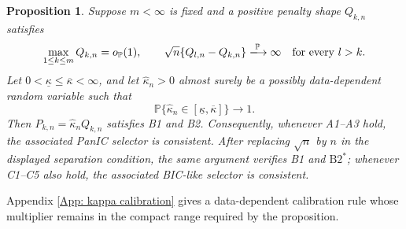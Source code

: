 \documentclass[12pt]{article}
\newenvironment{bluechange}{\begingroup\color[rgb]{0.00,0.00,1.00}}{\endgroup}
\newtheorem{proposition}{Proposition}
\theoremstyle{remark}
\theoremstyle{plain}
\begin{document}
\begin{bluechange}
\begin{proposition}\label{Prop: uniform kappa}
Suppose $m<\infty$ is fixed and a positive penalty shape $Q_{k,n}$ satisfies
\[
\max_{1\le k\le m}Q_{k,n}=o_{\mathbb P}(1),
\qquad
\sqrt n\{Q_{l,n}-Q_{k,n}\}\xlongrightarrow{\mathbb P}\infty
\quad\text{for every }l>k.
\]
Let $0<\underline\kappa\le\overline\kappa<\infty$, and let $\widehat\kappa_n>0$ almost surely be a possibly data-dependent random variable such that
\[
\mathbb P\{\widehat\kappa_n\in[\underline\kappa,\overline\kappa]\}\longrightarrow1.
\]
Then $P_{k,n}=\widehat\kappa_nQ_{k,n}$ satisfies B1 and B2. Consequently, whenever A1--A3 hold, the associated PanIC selector is consistent. After replacing $\sqrt n$ by $n$ in the displayed separation condition, the same argument verifies B1 and $\mathrm{B2}^*$; whenever C1--C5 also hold, the associated BIC-like selector is consistent.
\end{proposition}

Appendix \ref{App: kappa calibration} gives a data-dependent calibration rule whose multiplier remains in the compact range required by the proposition.
\end{bluechange}
\end{document}
